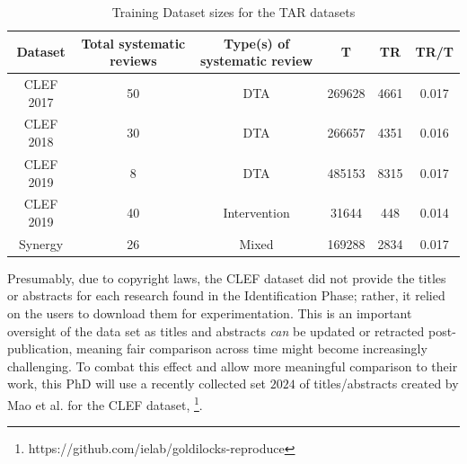 \documentclass[10pt,oneside]{book}
\begin{document}
\begin{table}
    \centering
    \begin{tabular}{|c|c|c|c|c|c|}
    \hline
        Dataset & Total systematic reviews & Type(s) of systematic review & T & TR & TR/T\\   \hline
        CLEF 2017 & 50 & DTA & 269628 & 4661  & 0.017 \\   \hline
        CLEF 2018 & 30 & DTA & 266657 & 4351 & 0.016\\   \hline
        CLEF   2019 & 8 & DTA & 485153 & 8315 & 0.017\\   \hline
        CLEF  2019 & 40 & Intervention & 31644 &  448 & 0.014 \\   \hline
        Synergy & 26 & Mixed & 169288 &  2834 & 0.017 \\   \hline
    \end{tabular}
    \caption{Training Dataset sizes for the TAR datasets}
    \label{tab:training_dataset_clef}
\end{table}

Presumably, due to copyright laws, the CLEF dataset did not provide the titles or abstracts for each research found in the Identification Phase; rather, it relied on the users to download them for experimentation. This is an important oversight of the data set as titles and abstracts \emph{can} be updated or retracted post-publication, meaning fair comparison across time might become increasingly challenging. To combat this effect and allow more meaningful comparison to their work, this PhD will use a recently collected set \(2024\) of titles/abstracts created by Mao et al. for the CLEF dataset, \cite{mao_reproducibility_2024}\footnote{https://github.com/ielab/goldilocks-reproduce}.
\end{document}
